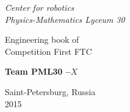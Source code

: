 \thispagestyle{titlestyle}
\begin{titlepage}
	
	\begin{center}
		\LARGE\textit{Center for robotics \\ Physics-Mathematics Lyceum 30}
        \begin{figure}[H]
        \end{figure}
		\vspace{3em}
		
		\LARGE{Engineering book of \\ Competition First FTC}
		
		\vspace{2em}
		
		\bf\fontsize{50}{60}\selectfont Team PML30 --${X}$ \\  \fontsize{11}{13}\selectfont
			
	\vspace{6em}
		
		\begin{figure}[H]
		\end{figure}
			
		\LARGE\normalfont Saint-Petersburg, Russia	\\ 2015
	\end{center}
\end{titlepage}

\newpage

